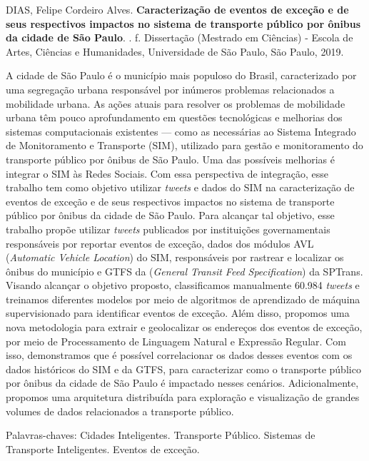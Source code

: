 \documentclass[
	12pt,				%
	oneside,			%
	a4paper,			%
	english,			%
	brazil				%
	]{abntex2ppgsi}
\begin{document}
\begin{resumo}

% 
%
% 
%
\begin{flushleft}
DIAS, Felipe Cordeiro Alves. \textbf{Caracterização de eventos de exceção e de seus respectivos impactos no sistema de transporte público por ônibus da cidade de São Paulo}. \imprimirdata. \pageref{LastPage} f. Dissertação (Mestrado em Ciências) - Escola de Artes, Ciências e Humanidades, Universidade de São Paulo, São Paulo, 2019.
\end{flushleft}

A cidade de São Paulo é o município mais populoso do Brasil, caracterizado por uma segregação urbana responsável por inúmeros problemas relacionados a mobilidade urbana. As ações atuais para resolver os problemas de mobilidade urbana têm pouco aprofundamento em questões tecnológicas e melhorias dos sistemas computacionais existentes --- como as necessárias ao Sistema Integrado de Monitoramento e Transporte (SIM), utilizado para gestão e monitoramento do transporte público por ônibus de São Paulo. Uma das possíveis melhorias é integrar o SIM às Redes Sociais. Com essa perspectiva de integração, esse trabalho tem como objetivo utilizar \textit{tweets} e dados do SIM na caracterização de eventos de exceção e de seus respectivos impactos no sistema de transporte público por ônibus da cidade de São Paulo. Para alcançar tal objetivo, esse trabalho propõe utilizar \textit{tweets} publicados por instituições governamentais responsáveis por reportar eventos de exceção, dados dos módulos AVL (\textit{Automatic Vehicle Location}) do SIM, responsáveis por rastrear e localizar os ônibus do município e GTFS da (\textit{General Transit Feed Specification}) da SPTrans. Visando alcançar o objetivo proposto, classificamos manualmente 60.984 \textit{tweets} e treinamos diferentes modelos por meio de algoritmos de aprendizado de máquina supervisionado para identificar eventos de exceção. Além disso, propomos uma nova metodologia para extrair e geolocalizar os endereços dos eventos de exceção, por meio de Processamento de Linguagem Natural e Expressão Regular. Com isso, demonstramos que é possível correlacionar os dados desses eventos com os dados históricos do SIM e da GTFS, para caracterizar como o transporte público por ônibus da cidade de São Paulo é impactado nesses cenários. Adicionalmente, propomos uma arquitetura distribuída para exploração e visualização de grandes volumes de dados relacionados a transporte público.

Palavras-chaves: Cidades Inteligentes. Transporte Público. Sistemas de Transporte Inteligentes. Eventos de exceção.
\end{resumo}
\end{document}
